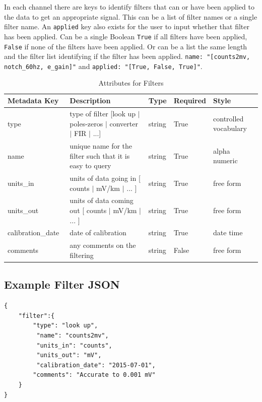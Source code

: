 \documentclass[12pt]{article}
\begin{document}
In each channel there are keys to identify filters that can or have been applied to the data to get an appropriate signal.  This can be a list of filter names or a single filter name.  An \verb|applied| key also exists for the user to input whether that filter has been applied.  Can be a single Boolean \verb|True| if all filters have been applied, \verb|False| if none of the filters have been applied.  Or can be a list the same length and the filter list identifying if the filter has been applied.  \verb|name: "[counts2mv, notch_60hz, e_gain]"| and \verb|applied: "[True, False, True]"|. 

\begin{table}[htb!]
    \caption[Attributes for Filter]{Attributes for Filters}
    \begin{tabular}{|l|p{2.75in}|l|l|p{.95in}|}
    	\hline
    	\textbf{Metadata Key} & \textbf{Description} & \textbf{Type} & \textbf{Required} & \textbf{Style}\\ \hline
        type\ & type of filter [look up $|$ poles-zeros $|$ converter $|$ FIR $|$ ...]& string &  True  & controlled vocabulary \\ \hline
        name\ & unique name for the filter such that it is easy to query & string & True  & alpha numeric\\ \hline
        units\_in\ & units of data going in [ counts $|$ mV/km $|$ ... ] & string & True  & free form\\ \hline
        units\_out\ & units of data coming out [ counts $|$ mV/km $|$ ... ] & string & True  &  free form \\ \hline
        calibration\_date\ & date of calibration & string &  True  &  date time\\ \hline
        comments\ & any comments on the filtering & string &  False  &  free form \\ \hline
    \end{tabular}
    \label{tab:filter}
\end{table}

\subsection{Example Filter JSON} 

\begin{verbatim}
{
    "filter":{
        "type": "look up",
         "name": "counts2mv",
         "units_in": "counts",
         "units_out": "mV",
         "calibration_date": "2015-07-01",
        "comments": "Accurate to 0.001 mV"
    }
}
\end{verbatim}
\end{document}
